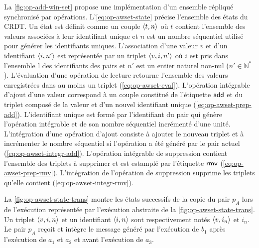 La \autoref{fig:op-add-win-set} propose une implémentation d'un ensemble répliqué synchronisé par opérations.
L'\autoref{eq:op-awset-state} précise l'ensemble des états du \ac{CRDT}.
Un état est définit comme un couple $\tuple*{t, n}$ où $t$ contient l'ensemble des valeurs associées à leur identifiant unique et $n$ est un nombre séquentiel utilisé pour générer les identifiants uniques.
L'association d'une valeur $v$ et d'un identifiant $\tuple*{i, n'}$ est représentée par un triplet $\tuple*{v, i, n'}$ où $i$ est pris dans l'ensemble $\mathbb{I}$ des identifiants des pairs et $n'$ est un entier naturel non-nul ($n' \in \mathbb{N}^*$).
L'évaluation d'une opération de lecture retourne l'ensemble des valeurs enregistrées dans au moins un triplet (\autoref{eq:op-awset-eval}).
L'opération intégrable d'ajout d'une valeur correspond à un couple constitué de l'étiquette $\trm{add}$ et du triplet composé de la valeur et d'un nouvel identifiant unique (\autoref{eq:op-awset-prep-add}).
L'identifiant unique est formé par l'identifiant du pair qui génère l'opération intégrable et de son nombre séquentiel incrémenté d'une unité.
L'intégration d'une opération d'ajout consiste à ajouter le nouveau triplet et à incrémenter le nombre séquentiel si l'opération a été généré par le pair actuel (\autoref{eq:op-awset-integr-add}).
L'opération intégrable de suppression contient l'ensemble des triplets à supprimer et est estamplé par l'étiquette $\trm{rmv}$ (\autoref{eq:op-awset-prep-rmv}).
L'intégration de l'opération de suppression supprime les triplets qu'elle contient (\autoref{eq:op-awset-integr-rmv}).

La \autoref{fig:op-awset-state-trans} montre les états successifs de la copie du pair $p_A$ lors de l'exécution représentée par l'exécution abstraite de la \autoref{fig:op-awset-state-trans}.
Un triplet $\tuple*{v, i, n}$ et un identifiant $\tuple*{i, n}$ sont respectivement notés $\tuple*{v, i_n}$ et $i_n$.
Le pair $p_A$ reçoit et intègre le message généré par l'exécution de $b_1$ après l'exécution de $a_1$ et $a_2$ et avant l'exécution de $a_3$.


